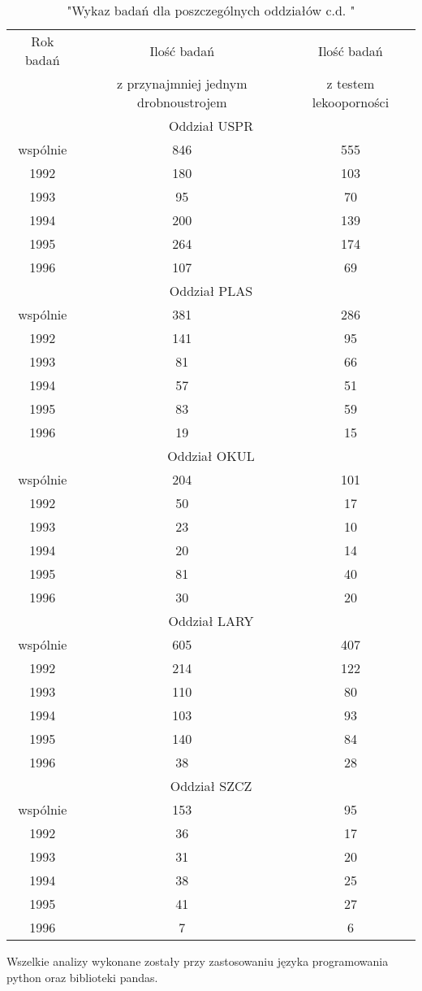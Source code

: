 \documentclass[a4paper,12pt]{article}
\begin{document}
\begin{table}[h]
\begin{center}
\caption{"Wykaz badań dla poszczególnych oddziałów c.d. "}
\begin{tabular}{c|c|c}
\hline
Rok badań & Ilość badań & Ilość badań \\
& z przynajmniej jednym drobnoustrojem &z testem lekooporności \\

\hline \multicolumn{3}{|c|}{Oddział USPR} \\ \hline
wspólnie &846 &555 \\
1992 &180 &103 \\
1993 &95 &70 \\
1994 &200 &139 \\
1995 &264 &174 \\
1996 &107 &69 \\
\hline \multicolumn{3}{|c|}{Oddział PLAS} \\ \hline
wspólnie &381 &286 \\
1992 &141 &95 \\
1993 &81 &66 \\
1994 &57 &51 \\
1995 &83 &59 \\
1996 &19 &15 \\
\hline \multicolumn{3}{|c|}{Oddział OKUL} \\ \hline
wspólnie &204 &101 \\
1992 &50 &17 \\
1993 &23 &10 \\
1994 &20 &14 \\
1995 &81 &40 \\
1996 &30 &20 \\
\hline \multicolumn{3}{|c|}{Oddział LARY} \\ \hline
wspólnie &605 &407 \\
1992 &214 &122 \\
1993 &110 &80 \\
1994 &103 &93 \\
1995 &140 &84 \\
1996 &38 &28 \\
\hline \multicolumn{3}{|c|}{Oddział SZCZ} \\ \hline
wspólnie &153 &95 \\
1992 &36 &17 \\
1993 &31 &20 \\
1994 &38 &25 \\
1995 &41 &27 \\
1996 &7 &6 \\

\end{tabular}
\end{center}
\end{table}

Wszelkie analizy wykonane zostały przy zastosowaniu języka programowania python oraz biblioteki pandas.
\end{document}
